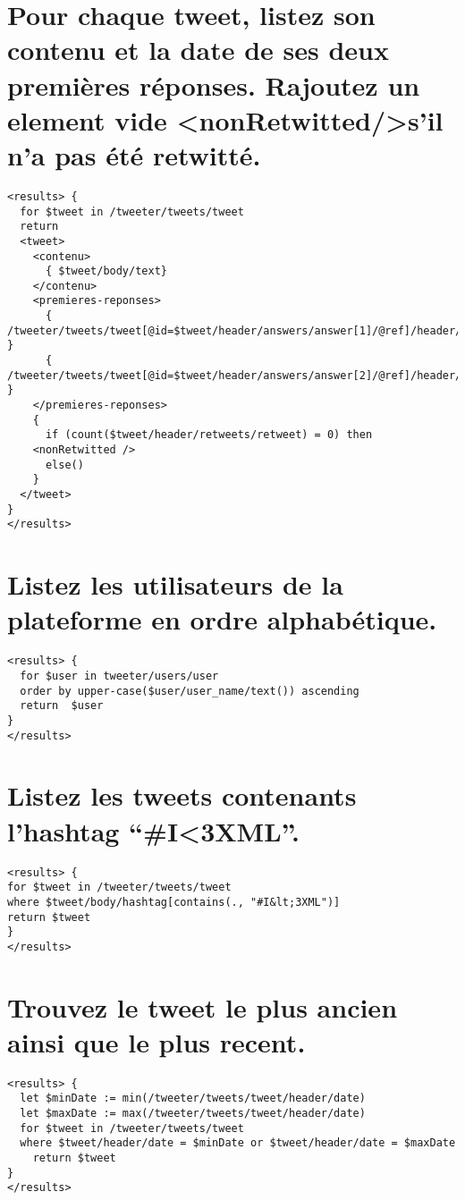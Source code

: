 \section{Pour chaque tweet, listez son contenu et la date de ses deux premières réponses. Rajoutez un element vide \textless nonRetwitted/\textgreater s’il n’a pas été retwitté.}
\begin{verbatim}
<results> {
  for $tweet in /tweeter/tweets/tweet
  return
  <tweet>
    <contenu>
      { $tweet/body/text}
    </contenu>
    <premieres-reponses>
      { /tweeter/tweets/tweet[@id=$tweet/header/answers/answer[1]/@ref]/header/date }
      { /tweeter/tweets/tweet[@id=$tweet/header/answers/answer[2]/@ref]/header/date }
    </premieres-reponses>
    {
      if (count($tweet/header/retweets/retweet) = 0) then
	<nonRetwitted />
      else()
    }
  </tweet>  
}
</results>
\end{verbatim}

\section{Listez les utilisateurs de la plateforme en ordre alphabétique.}
\begin{verbatim}
<results> {
  for $user in tweeter/users/user
  order by upper-case($user/user_name/text()) ascending
  return  $user
}
</results>
\end{verbatim}

\section{Listez les tweets contenants l’hashtag “\#I<3XML”.}
\begin{verbatim}
<results> {
for $tweet in /tweeter/tweets/tweet
where $tweet/body/hashtag[contains(., "#I&lt;3XML")]
return $tweet
}
</results>
\end{verbatim}

\section{Trouvez le tweet le plus ancien ainsi que le plus recent.}
\begin{verbatim}
<results> {
  let $minDate := min(/tweeter/tweets/tweet/header/date)
  let $maxDate := max(/tweeter/tweets/tweet/header/date)
  for $tweet in /tweeter/tweets/tweet
  where $tweet/header/date = $minDate or $tweet/header/date = $maxDate
    return $tweet
}
</results>
\end{verbatim}

